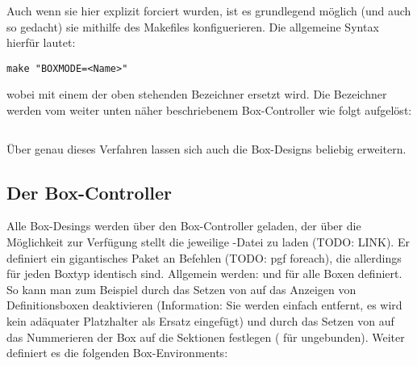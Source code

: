 Auch wenn sie hier explizit forciert wurden, ist es grundlegend möglich (und auch so gedacht) sie mithilfe des Makefiles konfiguerieren. Die allgemeine Syntax hierfür lautet:
\begin{lstlisting}[style=bash]
make "BOXMODE=<Name>"
\end{lstlisting}
wobei  mit einem der oben stehenden Bezeichner ersetzt wird. Die Bezeichner werden vom weiter unten näher beschriebenem Box-Controller wie folgt aufgelöst:
\begin{lstlisting}[style=latex,frame=none]

\end{lstlisting}
Über genau dieses Verfahren lassen sich auch die Box-Designs beliebig erweitern.
\subsection{Der Box-Controller}
{\centering {}\vspace*{0.5\baselineskip}\par}\reversemarginpar
Alle Box-Desings werden über den Box-Controller geladen, der über  die Möglichkeit zur Verfügung stellt die jeweilige -Datei zu laden (TODO: LINK). Er definiert ein gigantisches Paket an Befehlen (TODO: pgf foreach), die allerdings für jeden Boxtyp identisch sind. Allgemein werden:  und  für alle Boxen definiert. So kann man zum Beispiel durch das Setzen von  auf  das Anzeigen von Definitionsboxen deaktivieren (Information: Sie werden einfach entfernt, es wird kein adäquater Platzhalter als Ersatz eingefügt) und durch das Setzen von  auf das Nummerieren der Box auf die Sektionen festlegen ( für ungebunden).
Weiter definiert es die folgenden Box-Environments:
%

